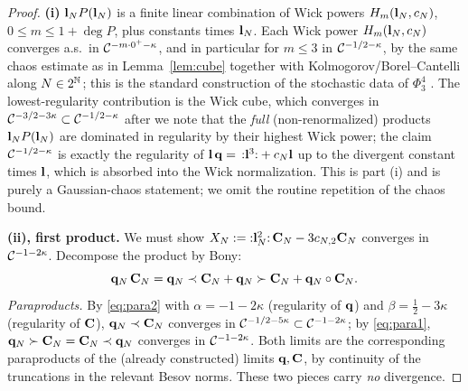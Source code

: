 \begin{proof}
\textbf{(i)} $\mathbf{l}_N P(\mathbf{l}_N)$ is a finite linear combination of Wick powers
$H_{m}(\mathbf{l}_N,c_N)$, $0\le m\le 1+\deg P$, plus constants times $\mathbf{l}_N$.
Each Wick power $H_m(\mathbf{l}_N,c_N)$ converges a.s.\ in $\mathcal{C}^{-m\cdot 0^+ -\kappa}$,
and in particular for $m\le 3$ in $\mathcal{C}^{-1/2-\kappa}$, by the same chaos estimate as in
Lemma~\ref{lem:cube} together with Kolmogorov/Borel--Cantelli along $N\in2^{\mathbb{N}}$;
this is the standard construction of the stochastic data of $\Phi^4_3$
\cite{CC18}. The lowest-regularity contribution is the Wick cube,
which converges in $\mathcal{C}^{-3/2-3\kappa}\subset\mathcal{C}^{-1/2-\kappa}$ after we note that the
\emph{full} (non-renormalized) products $\mathbf{l}_NP(\mathbf{l}_N)$ are dominated in
regularity by their highest Wick power; the claim $\mathcal{C}^{-1/2-\kappa}$ is exactly the
regularity of $\mathbf{l}\,\mathbf{q}=\,{:}\mathbf{l}^3{:}+c_N\mathbf{l}$ up to the divergent constant times
$\mathbf{l}$, which is absorbed into the Wick normalization. This is part (i) and is
purely a Gaussian-chaos statement; we omit the routine repetition of the chaos bound.

\medskip
\textbf{(ii), first product.} We must show
$X_N:={:}\mathbf{l}_N^2{:}\,\mathbf{C}_N-3c_{N,2}\mathbf{C}_N$ converges in $\mathcal{C}^{-1-2\kappa}$.
Decompose the product by Bony:
\begin{equation}\label{eq:bony1}
\mathbf{q}_N\,\mathbf{C}_N=\mathbf{q}_N\prec\mathbf{C}_N+\mathbf{q}_N\succ\mathbf{C}_N+\mathbf{q}_N\circ\mathbf{C}_N .
\end{equation}
\emph{Para\-products.} By \eqref{eq:para2} with
$\alpha=-1-2\kappa$ (regularity of $\mathbf{q}$) and $\beta=\tfrac12-3\kappa$
(regularity of $\mathbf{C}$), $\mathbf{q}_N\prec\mathbf{C}_N$ converges in
$\mathcal{C}^{-1/2-5\kappa}\subset\mathcal{C}^{-1-2\kappa}$; by \eqref{eq:para1},
$\mathbf{q}_N\succ\mathbf{C}_N=\mathbf{C}_N\prec\mathbf{q}_N$ converges in $\mathcal{C}^{-1-2\kappa}$. Both limits
are the corresponding paraproducts of the (already constructed) limits
$\mathbf{q},\mathbf{C}$, by continuity of the truncations in the relevant Besov norms.
These two pieces carry \emph{no} divergence.


\end{proof}
